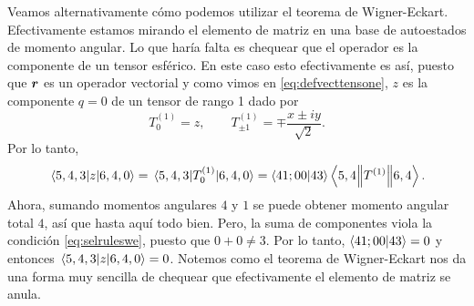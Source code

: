 \documentclass[10pt, a4paper]{article}
\numberwithin{equation}{subsection}
\begin{document}
Veamos alternativamente cómo podemos utilizar el teorema de Wigner-Eckart.
Efectivamente estamos mirando el elemento de matriz en una base de autoestados
de momento angular. Lo que haría falta es chequear que el operador es la
componente de un tensor esférico. En este caso esto efectivamente es así,
puesto que $\vb*{r}$ es un operador vectorial y como vimos en
\eqref{eq:defvecttensone}, $z$ es la componente $q = 0$ de un tensor de rango
1 dado por
\begin{equation} \label{eq:deftensonepos}
  T^{(1)}_0 = z, \qquad T^{(1)}_{\pm1} = \mp\frac{x \pm iy}{\sqrt{2}}.
\end{equation}
Por lo tanto,
\begin{equation}
  \matrixel{5,4,3}{z}{6,4,0} = 
  \matrixel{5,4,3}{T^{(1)}_0}{6,4,0} = \braket{41;00}{43}
  \doublebarmel{5,4}{T^{(1)}}{6,4}.
\end{equation}
Ahora, sumando momentos angulares $4$ y $1$ se puede obtener momento angular
total $4$, así que hasta aquí todo bien. Pero, la suma de componentes viola la
condición \eqref{eq:selruleswe}, puesto que $0 + 0 \neq 3$. Por lo tanto,
$\braket{41;00}{43} = 0$ y entonces $\matrixel{5,4,3}{z}{6,4,0} = 0$. Notemos
como el teorema de Wigner-Eckart nos da una forma muy sencilla de chequear que
efectivamente el elemento de matriz se anula.

\bigbreak
\end{document}

